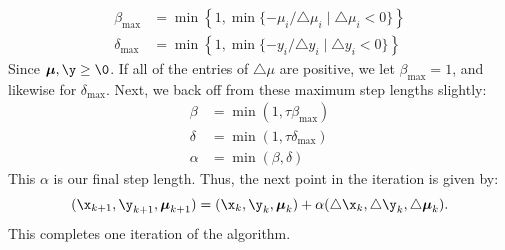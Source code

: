 \begin{align*}
\beta_{\max} &= \min\left\{1, \min\{-\mu_i/\triangle \mu_i \mid \triangle \mu_i < 0 \}\right\}\\
\delta_{\max} &= \min\left\{1, \min\{-y_i/\triangle y_i \mid \triangle y_i < 0 \}\right\}
\end{align*}
Since $\Mu,\y \geq \0$.
If all of the entries of $\triangle \mu$ are positive, we let $\beta_{\max} = 1$, and likewise for $\delta_{\max}$.
Next, we back off from these maximum step lengths slightly:
\begin{align*}
\beta &= \min(1, \tau\beta_{\max})\\
\delta &= \min(1, \tau\delta_{\max})\\
\alpha &= \min(\beta, \delta)
\end{align*}
This $\alpha$ is our final step length.
Thus, the next point in the iteration is given by:
\[
(\x_{k+1}, \y_{k+1}, \Mu_{k+1}) = (\x_k, \y_k, \Mu_k) + \alpha(\triangle \x_k, \triangle \y_k, \triangle \Mu_k).
\]
This completes one iteration of the algorithm.

